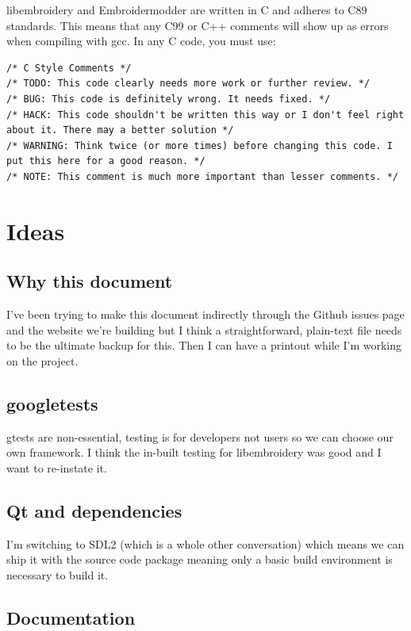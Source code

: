 \documentclass{report}
\begin{document}
libembroidery and Embroidermodder are written in C and adheres to C89 standards. This means
that any C99 or C++ comments will show up as errors when compiling with
gcc. In any C code, you must use:

\begin{lstlisting}
/* C Style Comments */
/* TODO: This code clearly needs more work or further review. */
/* BUG: This code is definitely wrong. It needs fixed. */
/* HACK: This code shouldn't be written this way or I don't feel right about it. There may a better solution */
/* WARNING: Think twice (or more times) before changing this code. I put this here for a good reason. */
/* NOTE: This comment is much more important than lesser comments. */
\end{lstlisting}

\section{Ideas}

\subsection{Why this document}

I've been trying to make this document indirectly through the Github
issues page and the website we're building but I think a
straightforward, plain-text file needs to be the ultimate backup for
this. Then I can have a printout while I'm working on the project.

\subsection{googletests}

gtests are non-essential, testing is for developers not users so we can
choose our own framework. I think the in-built testing for libembroidery
was good and I want to re-instate it.

\subsection{Qt and dependencies}

I'm switching to SDL2 (which is a whole other conversation) which means
we can ship it with the source code package meaning only a basic build
environment is necessary to build it.

\subsection{Documentation}
\end{document}
